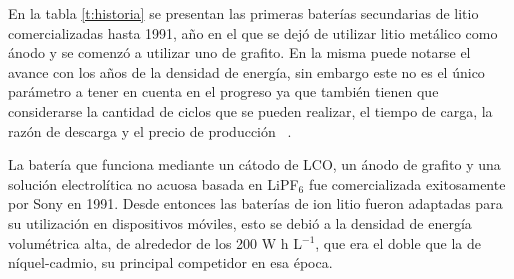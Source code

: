 En la tabla \ref{t:historia} se presentan las primeras baterías secundarias de 
litio comercializadas hasta 1991, año en el que se dejó de utilizar litio 
metálico como ánodo y se comenzó a utilizar uno de grafito. En la misma puede 
notarse el avance con los años de la densidad de energía, sin embargo este no es 
el único parámetro a tener en cuenta en el progreso ya que también tienen que 
considerarse la cantidad de ciclos que se pueden realizar, el tiempo de carga, la 
razón de descarga y el precio de producción ~\cite{reddy2020}. 
\begin{table}[h]
    \centering
    \caption{Primeras baterías de litio recargables comercializadas 
    ~\cite{reddy2020}.}
    \setlength\extrarowheight{2pt}
    \label{t:historia}
\end{table}

La batería que funciona mediante un cátodo de LCO, un ánodo de grafito y una
solución electrolítica no acuosa basada en LiPF$_6$ fue comercializada
exitosamente por Sony en 1991. Desde entonces las baterías de ion litio fueron
adaptadas para su utilización en dispositivos móviles, esto se debió a la
densidad de energía volumétrica alta, de alrededor de los 200 W h L$^{-1}$, que
era el doble que la de níquel-cadmio, su principal competidor en esa época.

